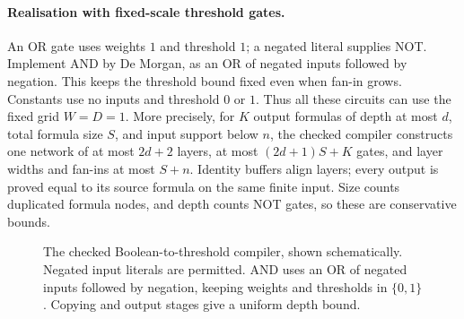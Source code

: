 \documentclass[twoside,11pt]{article}
\numberwithin{theorem}{section}
\numberwithin{equation}{section}
\begin{document}
\paragraph{Realisation with fixed-scale threshold gates.}
An OR gate uses weights $1$ and threshold $1$; a negated literal supplies NOT. Implement AND by De Morgan, as an OR of negated inputs followed by negation. This keeps the threshold bound fixed even when fan-in grows. Constants use no inputs and threshold $0$ or $1$. Thus all these circuits can use the fixed grid $W=D=1$.
More precisely, for $K$ output formulas of depth at most $d$, total formula size $S$, and input support below $n$, the checked compiler constructs one network of at most $2d+2$ layers, at most $(2d+1)S+K$ gates, and layer widths and fan-ins at most $S+n$. Identity buffers align layers; every output is proved equal to its source formula on the same finite input. Size counts duplicated formula nodes, and depth counts NOT gates, so these are conservative bounds.


\begin{figure}[htbp]
\centering
{}
\caption{The checked Boolean-to-threshold compiler, shown schematically. Negated input literals are permitted. AND uses an OR of negated inputs followed by negation, keeping weights and thresholds in $\{0,1\}$. Copying and output stages give a uniform depth bound.}
\label{fig:threshold-compilation}
\end{figure}
\end{document}
